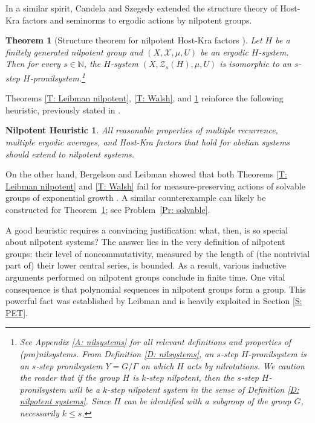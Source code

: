 \documentclass[11pt]{amsart}
\newtheorem{theorem}[lemma]{Theorem}
\newtheorem*{nh}{Nilpotent Heuristic}
\theoremstyle{definition}
\newcommand{\N}{{\mathbb N}}
\newcommand{\CX}{{\mathcal X}}
\newcommand{\CZ}{{\mathcal Z}}
\newcommand{\1}{{\mathbf{1}}}
\begin{document}
In a similar spirit, Candela and Szegedy extended the structure theory of Host-Kra factors and seminorms to ergodic actions by nilpotent groups.
\begin{theorem}[Structure theorem for nilpotent Host-Kra factors {\cite{CS23}}]\label{T: Candela-Szegedy}
    Let $H$ be a finitely generated nilpotent group and $(X, \CX, \mu, U)$ be an ergodic $H$-system. Then for every $s\in\N$, the $H$-system $(X, \CZ_s(H), \mu, U)$ is isomorphic to an $s$-step $H$-pronilsystem.\footnote{See Appendix \ref{A: nilsystems} for all relevant definitions and properties of (pro)nilsystems. {From Definition \ref{D: nilsystems}, an $s$-step $H$-pronilsystem is an $s$-step pronilsystem $Y=G/\Gamma$ on which $H$ acts by nilrotations. We caution the reader that if the group $H$ is $k$-step nilpotent, then the $s$-step $H$-pronilsystem  will be a $k$-step nilpotent system in the sense of Definition \ref{D: nilpotent systems}. Since $H$ can be identified with a subgroup of the group $G$, necessarily $k\leq s$.}}
\end{theorem}



Theorems \ref{T: Leibman nilpotent}, \ref{T: Walsh}, and \ref{T: Candela-Szegedy} reinforce the following heuristic, previously stated in \cite{Kuc26}. 
\begin{nh}\label{H: nilpotent heuristic}
    All reasonable properties of multiple recurrence, multiple ergodic averages, and Host-Kra factors that hold for abelian systems should extend to nilpotent systems.
\end{nh}

On the other hand, Bergelson and Leibman showed that both Theorems \ref{T: Leibman nilpotent} and \ref{T: Walsh} fail for measure-preserving actions of solvable groups of exponential growth \cite{BL02, BL04}. A similar counterexample can likely be constructed for Theorem~\ref{T: Candela-Szegedy}; see Problem~\ref{Pr: solvable}.


A good heuristic requires a convincing justification: what, then, is so special about nilpotent systems? The answer lies in the very definition of nilpotent groups: their level of noncommutativity, measured by the length of (the nontrivial part of) their lower central series, is bounded. As a result, various inductive arguments performed on nilpotent groups conclude in finite time. One vital consequence is that polynomial sequences in nilpotent groups form a group. This powerful fact was established by Leibman \cite{L02} and is heavily exploited in Section \ref{S: PET}.
\end{document}
